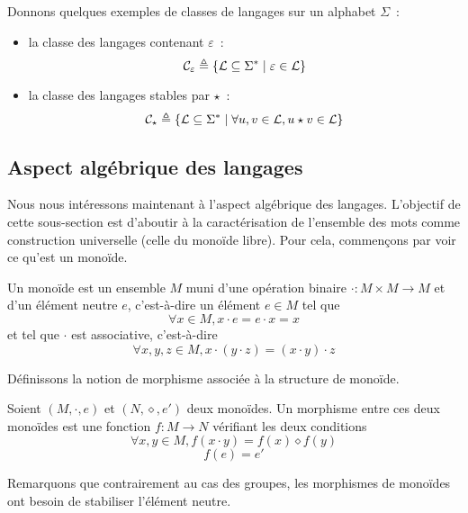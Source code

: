\begin{example}
  Donnons quelques exemples de classes de langages sur un alphabet $\Sigma$~:
  \begin{itemize}
  \item la classe des langages contenant $\varepsilon$~:
    \[\mathcal C_\varepsilon \triangleq \{\mathcal L \subseteq \Sigma^*\mid
    \varepsilon \in \mathcal L\}\]
  \item la classe des langages stables par $\star$~:
    \[\mathcal C_\star \triangleq \{\mathcal L \subseteq \Sigma^*\mid
    \forall u,v\in\mathcal L, u\star v \in \mathcal L\}\]
  \end{itemize}
\end{example}

\subsection{Aspect algébrique des langages}

Nous nous intéressons maintenant à l'aspect algébrique des langages. L'objectif
de cette sous-section est d'aboutir à la caractérisation de l'ensemble des mots
comme construction universelle (celle du monoïde libre). Pour cela, commençons
par voir ce qu'est un monoïde.

\begin{definition}[Monoïde]
  Un monoïde est un ensemble $M$ muni d'une opération binaire
  $\cdot : M \times M \to M$ et d'un élément neutre $e$,
  c'est-à-dire un élément $e\in M$ tel que
  \[\forall x\in M, x\cdot e = e \cdot x = x\]
  et tel que $\cdot$ est associative, c'est-à-dire
  \[\forall x,y,z\in M, x\cdot (y\cdot z) = (x\cdot y) \cdot z\]
\end{definition}

Définissons la notion de morphisme associée à la structure de monoïde.

\begin{definition}
  Soient $(M,\cdot,e)$ et $(N,\diamond,e')$ deux monoïdes. Un morphisme entre
  ces deux monoïdes est une fonction $f : M \to N$ vérifiant les deux conditions
  \begin{equation}
    \forall x,y\in M, f(x\cdot y) = f(x)\diamond f(y)
  \end{equation}
  \begin{equation}
    f(e) = e'
  \end{equation}
\end{definition}

Remarquons que contrairement au cas des groupes, les morphismes de monoïdes ont
besoin de stabiliser l'élément neutre.


